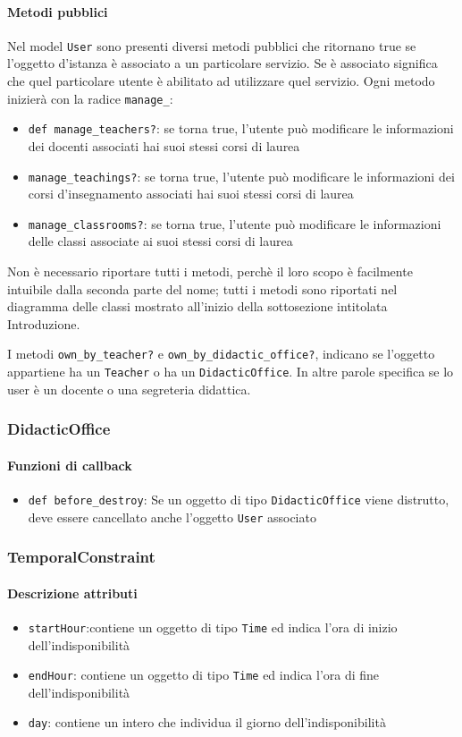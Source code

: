 \documentclass[11pt,a4paper]{article}
\begin{document}
\paragraph{Metodi pubblici}
Nel model \verb|User| sono presenti diversi metodi pubblici che ritornano true se l'oggetto d'istanza è associato a un particolare servizio. Se è associato significa che quel particolare utente è abilitato ad utilizzare quel servizio.
Ogni metodo inizierà con la radice \verb|manage_|:
\begin{itemize}
 \item \verb|def manage_teachers?|: se torna true, l'utente può modificare le informazioni dei docenti associati hai suoi stessi corsi di laurea
 \item \verb|manage_teachings?|: se torna true, l'utente può modificare le informazioni dei corsi d'insegnamento associati hai suoi stessi corsi di laurea 
 \item \verb|manage_classrooms?|: se torna true, l'utente può modificare le informazioni delle classi associate ai suoi stessi corsi di laurea
 \end{itemize}
Non è necessario riportare tutti i metodi, perchè il loro scopo è facilmente intuibile dalla seconda parte del nome; tutti i metodi sono riportati nel diagramma delle classi mostrato all'inizio della sottosezione intitolata Introduzione.

I metodi \verb|own_by_teacher?| e \verb|own_by_didactic_office?|, indicano se l'oggetto appartiene ha un \verb|Teacher| o ha un \verb|DidacticOffice|. In altre parole specifica se lo user è un docente o una segreteria didattica.
\subsubsection{DidacticOffice}
\paragraph{Funzioni di callback}
\begin{itemize}
 \item \verb|def before_destroy|: Se un oggetto di tipo \verb|DidacticOffice| viene distrutto, deve essere cancellato anche l'oggetto \verb|User| associato
\end{itemize}
\subsubsection{TemporalConstraint}
\paragraph{Descrizione attributi}
\begin{itemize}
 \item \verb|startHour|:contiene un oggetto di tipo \verb|Time| ed indica l'ora di inizio dell'indisponibilità
 \item \verb|endHour|: contiene un oggetto di tipo \verb|Time| ed indica l'ora di fine dell'indisponibilità
 \item \verb|day|: contiene un intero che individua il giorno dell'indisponibilità
\end{itemize}
\end{document}
